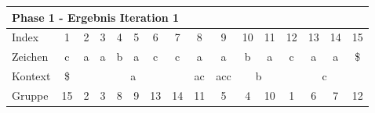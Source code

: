 \begin{table}[H]
\centering
\begin{adjustbox}{max width=\textwidth}
\begin{tabular}{lccccccccccccccc}
\multicolumn{16}{l}{Phase 1 - Ergebnis Iteration 1}                                                                                                                                                                                                                                                                                                                                                                                                                      \\ \hline
\multicolumn{1}{l|}{Index}   & 1                         & 2                         & 3   & 4   & 5                         & 6                         & 7                         & 8                                               & 9                                                & 10  & 11                        & \cellcolor[HTML]{\green}12 & \cellcolor[HTML]{\green}13 & \cellcolor[HTML]{\green}14 & \cellcolor[HTML]{\green}15 \\
\multicolumn{1}{l|}{Zeichen} & c                         & a                         & a   & b   & a                         & c                         & c                         & a                                               & a                                                & b   & a                         & c                          & a                          & a                          & \$                         \\ \cline{1-16}
\multicolumn{1}{l|}{Kontext} & \multicolumn{1}{c|}{\$}   & \multicolumn{6}{c|}{a}                                                                                                    & \multicolumn{1}{c|}{\cellcolor[HTML]{\red}ac} & \multicolumn{1}{c|}{\cellcolor[HTML]{\red}acc} & \multicolumn{2}{c|}{b}          & \multicolumn{4}{c}{c}                                                                                             \\
\multicolumn{1}{l|}{Gruppe}      & \multicolumn{1}{c|}{15}   & 2                         & 3   & 8   & 9                         & 13                        & \multicolumn{1}{c|}{14}   & \multicolumn{1}{c|}{\cellcolor[HTML]{\red}11} & \multicolumn{1}{c|}{\cellcolor[HTML]{\red}5}   & 4   & \multicolumn{1}{c|}{10}   & 1                          & 6                          & 7                          & 12                         \\

\end{tabular}
\end{adjustbox}
\end{table}
